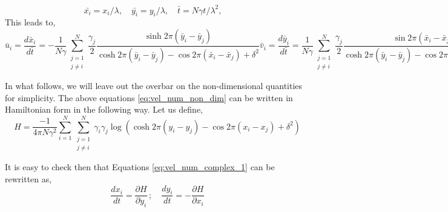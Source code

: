 \documentclass{article}
\begin{document}
\begin{equation}
\bar{x_i}=x_i / \lambda, \quad \bar{y_i}=y_i / \lambda, \quad \bar{t}=N\gamma t/\lambda^2, \quad %
\end{equation}
This leads to,
\begin{subequations}\label{eq:vel_num_non_dim}
\begin{equation}
\bar{u}_i= \frac{d\bar{x}_i}{d\bar{t}}=-\frac{1}{N\gamma}\sum_{\substack{j=1 \\ j\neq i}}^{N} \frac{\gamma_j}{2} \frac{\sinh 2\pi(\bar{y}_i-\bar{y}_j)}{\cosh 2\pi(\bar{y}_i-\bar{y}_j)-\cos 2\pi(\bar{x}_i-\bar{x}_j)+\delta^2}
\end{equation}
\begin{equation}
\bar{v}_i= \frac{d\bar{y}_i}{d\bar{t}}= \frac{1}{N\gamma}\sum_{\substack{j=1 \\ j\neq i}}^{N} \frac{\gamma_j}{2} \frac{\sin 2\pi(\bar{x}_i-\bar{x}_j)}{\cosh 2\pi(\bar{y}_i-\bar{y}_j)-\cos 2\pi(\bar{x}_i-\bar{x}_j)+\delta^2}
\end{equation}
\end{subequations}

In what follows, we will leave out the overbar on the non-dimensional quantities for simplicity. The above equations \eqref{eq:vel_num_non_dim} can be written in Hamiltonian form in the following way. Let us define,
\begin{equation}\label{eq:Hamiltonian}
H=\frac{-1}{4\pi N \gamma^2}\sum_{i=1}^N\sum_{\substack{j=1 \\ j\neq i}}^{N}\gamma_i \gamma_j \log \left( \cosh {2\pi(y_i-y_j)} -\cos {2\pi(x_i-x_j)} +\delta^2\right)
\end{equation}

It is easy to check then that Equations \eqref{eq:vel_num_complex_1} can be rewritten as,
\begin{equation}\label{eq:Hamilitonian_system}
\frac{dx_i}{dt}=\frac{\partial H}{\partial y_i}\, ; \quad \frac{dy_i}{dt}=-\frac{\partial H}{\partial x_i}
\end{equation}
\end{document}
